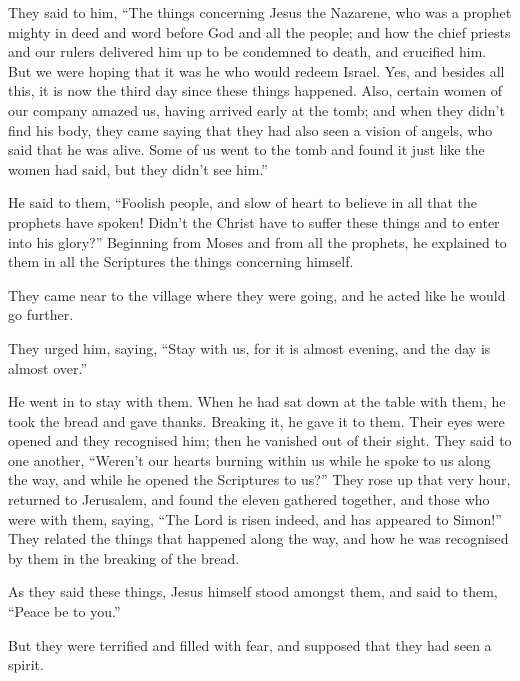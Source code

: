 They said to him, ``The things concerning Jesus the Nazarene, who was a
prophet mighty in deed and word before God and all the people;
 and how the chief priests and our rulers delivered him
up to be condemned to death, and crucified him.  But we
were hoping that it was he who would redeem Israel. Yes, and besides all
this, it is now the third day since these things happened.
 Also, certain women of our company amazed us, having
arrived early at the tomb;  and when they didn't find his
body, they came saying that they had also seen a vision of angels, who
said that he was alive.  Some of us went to the tomb and
found it just like the women had said, but they didn't see him.''

 He said to them, ``Foolish people, and slow of heart to
believe in all that the prophets have spoken!  Didn't the
Christ have to suffer these things and to enter into his glory?''
 Beginning from Moses and from all the prophets, he
explained to them in all the Scriptures the things concerning himself.

 They came near to the village where they were going, and
he acted like he would go further.

 They urged him, saying, ``Stay with us, for it is almost
evening, and the day is almost over.''

He went in to stay with them.  When he had sat down at
the table with them, he took the bread and gave thanks. Breaking it, he
gave it to them.  Their eyes were opened and they
recognised him; then he vanished out of their sight. 
They said to one another, ``Weren't our hearts burning within us while
he spoke to us along the way, and while he opened the Scriptures to
us?''  They rose up that very hour, returned to
Jerusalem, and found the eleven gathered together, and those who were
with them,  saying, ``The Lord is risen indeed, and has
appeared to Simon!''  They related the things that
happened along the way, and how he was recognised by them in the
breaking of the bread.

 As they said these things, Jesus himself stood amongst
them, and said to them, ``Peace be to you.''

 But they were terrified and filled with fear, and
supposed that they had seen a spirit.

